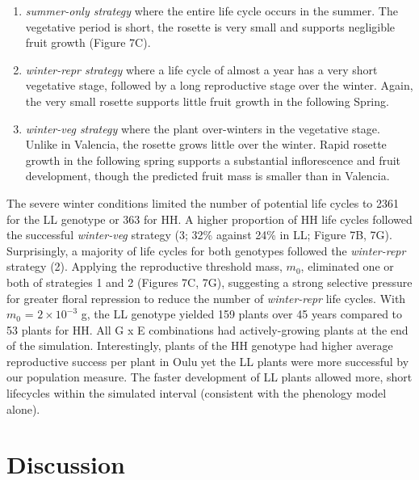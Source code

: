 \documentclass[phd]{infthesis}
\begin{document}
\begin{enumerate}
\def\labelenumi{\arabic{enumi}.}
\item
  \emph{summer-only strategy} where the entire life cycle occurs in the
  summer. The vegetative period is short, the rosette is very small and
  supports negligible fruit growth (Figure 7C).
\item
  \emph{winter-repr strategy} where a life cycle of almost a year has a
  very short vegetative stage, followed by a long reproductive stage
  over the winter. Again, the very small rosette supports little fruit
  growth in the following Spring.
\item
  \emph{winter-veg strategy} where the plant over-winters in the
  vegetative stage. Unlike in Valencia, the rosette grows little over
  the winter. Rapid rosette growth in the following spring supports a
  substantial inflorescence and fruit development, though the predicted
  fruit mass is smaller than in Valencia.
\end{enumerate}

The severe winter conditions limited the number of potential life cycles
to 2361 for the LL genotype or 363 for HH. A higher proportion of HH
life cycles followed the successful \emph{winter-veg} strategy (3; 32\%
against 24\% in LL; Figure 7B, 7G). Surprisingly, a majority of life
cycles for both genotypes followed the \emph{winter-repr} strategy (2).
Applying the reproductive threshold mass, \(m_{0}\), eliminated one or
both of strategies 1 and 2 (Figures 7C, 7G), suggesting a strong
selective pressure for greater floral repression to reduce the number of
\emph{winter-repr} life cycles. With \(m_{0}\) = \(2 \times 10^{- 3}\)
g, the LL genotype yielded 159 plants over 45 years compared to 53
plants for HH. All G x E combinations had actively-growing plants at the
end of the simulation. Interestingly, plants of the HH genotype had
higher average reproductive success per plant in Oulu yet the LL plants
were more successful by our population measure. The faster development
of LL plants allowed more, short lifecycles within the simulated
interval (consistent with the phenology model alone).

\section{Discussion}
\label{discussion}
\end{document}
